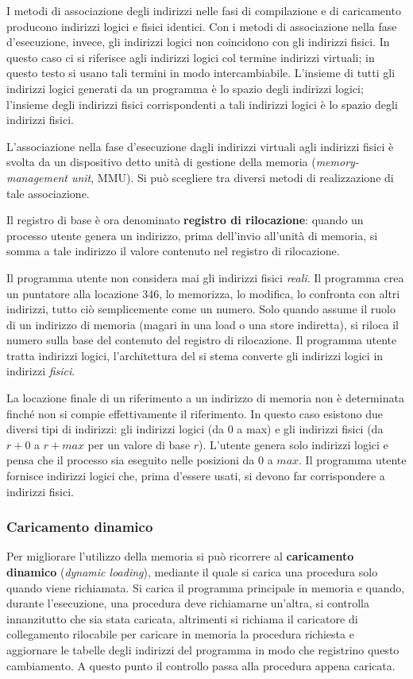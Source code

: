\documentclass[11pt,a4paper]{article}
\begin{document}
I metodi di associazione degli indirizzi nelle fasi di compilazione e di caricamento pro­ducono indirizzi logici e fisici identici. Con i metodi di associazione nella fase d'esecuzione,
invece, gli indirizzi logici non coincidono con gli indirizzi fisici. In questo caso ci si riferisce agli indirizzi logici col termine indirizzi virtuali; in questo testo si usano tali ter­mini in modo intercambiabile. L'insieme di tutti gli indirizzi logici generati da un program­ma è lo spazio degli indirizzi logici; l'insieme degli indirizzi fisici corrispondenti a tali indi­rizzi logici è lo spazio degli indirizzi fisici.

L'associazione nella fase d'esecuzione dagli indirizzi virtuali agli indirizzi fisici è svolta
da un dispositivo detto unità di gestione della memoria (\emph{memory-management unit}, MMU). Si può scegliere tra diversi metodi di realizzazio­ne di tale associazione.

Il registro di base è ora denominato \textbf{registro di rilocazione}:
quando un processo utente genera un indirizzo, prima dell'invio all'unità di memoria, si
somma a tale indirizzo il valore contenuto nel registro di rilocazione.

Il programma utente non considera mai gli indirizzi fisici \emph{reali}. Il programma crea un
puntatore alla locazione 346, lo memorizza, lo modifica, lo confronta con altri indirizzi, tut­to ciò semplicemente come un numero. Solo quando assume il ruolo di un indirizzo di me­moria (magari in una load o una store indiretta), si riloca il numero sulla base del contenu­to del registro di rilocazione. Il programma utente tratta indirizzi logici, l'architettura del si­
stema converte gli indirizzi logici in indirizzi \emph{fisici}.

La locazione finale di un riferimento a un indirizzo di memoria
non è determinata finché non si compie effettivamente il riferimento.
In questo caso esistono due diversi tipi di indirizzi: gli indirizzi logici (da 0 a max) e gli indirizzi fisici (da $r+0$ a $r+max$ per un valore di base $r$).
L'utente genera solo indirizzi logici e pensa che il processo sia eseguito nelle posizioni da $0$ a
$max$. Il programma utente fornisce indirizzi logici che, prima d'essere usati, si devono far
corrispondere a indirizzi fisici.

\subsubsection{Caricamento dinamico}
Per migliorare l'utilizzo della memoria si può ricorrere al \textbf{caricamento dinamico} (\emph{dynamic
loading}), mediante il quale si carica una procedura solo quando viene richiamata.
Si ca­rica il programma principale in memoria e quando, durante l'esecuzione, una procedura de­ve richiamarne un'altra, si controlla innanzitutto che sia stata caricata, altrimenti si richiama
il caricatore di collegamento rilocabile per caricare in memoria la procedura richiesta e aggiornare le tabelle degli indirizzi del programma in modo che registrino questo cambiamento. A questo punto il controllo passa alla procedura appena caricata.
\end{document}
